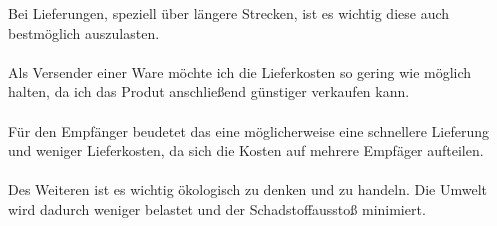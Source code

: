 Bei Lieferungen, speziell über längere Strecken, ist es wichtig diese auch bestmöglich auszulasten. 
\\\\
Als Versender einer Ware möchte ich die Lieferkosten so gering wie möglich halten, da ich
das Produt anschließend günstiger verkaufen kann.
\\\\
Für den Empfänger beudetet das eine möglicherweise eine schnellere Lieferung und weniger Lieferkosten,
da sich die Kosten auf mehrere Empfäger aufteilen.
\\\\
Des Weiteren ist es wichtig ökologisch zu denken und zu handeln. Die Umwelt wird dadurch weniger
belastet und der Schadstoffausstoß minimiert.